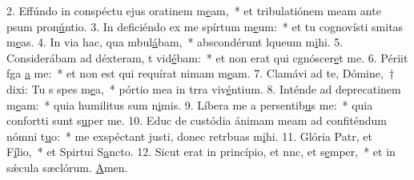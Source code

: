 2. Effúndo in conspéctu ejus oratinem m\uline{e}am,~* et tribulatiónem meam ante psum pron\uline{ú}ntio.
3. In deficiéndo ex me spírtum m\uline{e}um:~* et tu cognovísti smitas m\uline{e}as.
4. In via hac, qua mbul\uline{á}bam,~* abscondérunt lqueum m\uline{i}hi.
5. Considerábam ad déxteram, t vid\uline{é}bam:~* et non erat qui cgnóscer\uline{e}t me.
6. Périit fga \uline{a} me:~* et non est qui requírat nimam m\uline{e}am.
7. Clamávi ad te, Dómine,~† dixi: Tu s spes m\uline{e}a,~* pórtio mea in trra viv\uline{é}ntium.
8. Inténde ad deprecatinem m\uline{e}am:~* quia humilitus sum n\uline{i}mis.
9. Líbera me a persentib\uline{u}s me:~* quia confortti sunt s\uline{u}per me.
10. Educ de custódia ánimam meam ad confiténdum nómni t\uline{u}o:~* me exspéctant justi, donec retrbuas m\uline{i}hi.
11. Glória Patr, et F\uline{í}lio,~* et Spirtui S\uline{a}ncto.
12. Sicut erat in princípio, et nnc, et s\uline{e}mper,~* et in sǽcula sæclórum. \uline{A}men.
